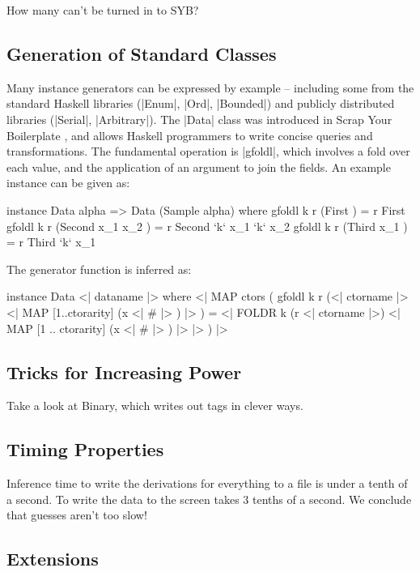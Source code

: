 \documentclass[preprint,draft]{sigplanconf}
\begin{document}
How many can't be turned in to SYB?

\subsection{Generation of Standard Classes}
\label{sec:automatic_success}

Many instance generators can be expressed by example -- including some from the standard Haskell libraries (|Enum|, |Ord|, |Bounded|) and publicly distributed libraries (|Serial|, |Arbitrary|). The |Data| class was introduced in Scrap Your Boilerplate \cite{lammel:syb}, and allows Haskell programmers to write concise queries and transformations. The fundamental operation is |gfoldl|, which involves a fold over each value, and the application of an argument to join the fields. An example instance can be given as:

\begin{code}
instance Data alpha => Data (Sample alpha) where
    gfoldl k r (First            ) = r First
    gfoldl k r (Second  x_1 x_2  ) = r Second  `k` x_1 `k` x_2
    gfoldl k r (Third   x_1      ) = r Third   `k` x_1
\end{code}

\noindent The generator function is inferred as:

\ignore\begin{code}
instance Data \? <| dataname |> where
    <| MAP ctors (
        gfoldl k r
            (<| ctorname |> \? <| MAP [1..ctorarity] (x <| # |> ) |> ) =
            <| FOLDR k (r \? <| ctorname |>)
                <| MAP [1 .. ctorarity] (x <| # |> ) |>
            |>
    ) |>
\end{code}

\subsection{Tricks for Increasing Power}

Take a look at Binary, which writes out tags in clever ways.

\subsection{Timing Properties}

Inference time to write the derivations for everything to a file is under a tenth of a second. To write the data to the screen takes 3 tenths of a second. We conclude that guesses aren't too slow!

\subsection{Extensions}
\label{sec:extensions}
\end{document}
